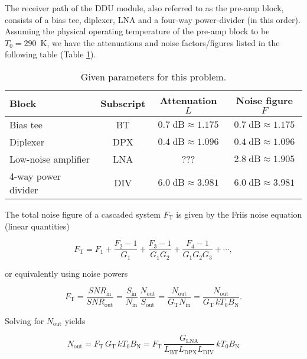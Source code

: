 \documentclass[a4paper, 12pt]{article}
\newlength{\halfLine}
\newcommand{\dB}{\mathrm{\;dB}}
\begin{document}
\vspace*{\halfLine}
\noindent
The receiver path of the DDU module, also referred to as the pre-amp block, 
consists of a bias tee, diplexer, LNA and a four-way power-divider (in this 
order). Assuming the physical operating temperature of the pre-amp block to be 
$T_0 = 290$~K, we have the attenuations and noise factors/figures listed in 
the following table (Table \ref{t:c2}).

\begin{table}[!h]
	\begin{center}
	\caption{Given parameters for this problem.}
	\label{t:c2}
	\renewcommand*{\arraystretch}{1.2}
	\begin{tabular}{lccc}
	\textbf{Block} 			& \textbf{Subscript}	& \textbf{Attenuation} $L$ 	& \textbf{Noise figure} $F$ \\
	\hline
	Bias tee				& BT					& $0.7 \dB \approx 1.175$	& $0.7 \dB \approx 1.175$ \\
	Diplexer				& DPX					& $0.4 \dB \approx 1.096$	& $0.4 \dB \approx 1.096$ \\
	Low-noise amplifier		& LNA					& ???						& $2.8 \dB \approx 1.905$ \\
	4-way power divider		& DIV					& $6.0 \dB \approx 3.981$	& $6.0 \dB \approx 3.981$
	\end{tabular}
	\end{center}
	\vspace*{-12pt}
\end{table}

The total noise figure of a cascaded system $F_\mathrm{T}$ is given by the 
Friis noise equation (linear quantities)

\begin{equation} \label{e:f}
F_\mathrm{T} = F_1 + \frac{F_2 - 1}{G_1} + \frac{F_3 - 1}{G_1 G_2} + \frac{F_4 - 1}{G_1 G_2 G_3} + \cdots,
\end{equation}

\noindent
or equivalently using noise powers

\begin{equation}
F_\mathrm{T} = \frac{\mathit{SNR}_\mathrm{in}}{\mathit{SNR}_\mathrm{out}} 
	= \frac{S_\mathrm{in}}{N_\mathrm{in}} \, \frac{N_\mathrm{out}}{S_\mathrm{out}}
	= \frac{N_\mathrm{out}}{G_\mathrm{T} N_\mathrm{in}}
	= \frac{N_\mathrm{out}}{G_\mathrm{T} \, k T_0 B_\mathrm{N}}.
\end{equation}

\noindent
Solving for $N_\mathrm{out}$ yields

\begin{equation}
N_\mathrm{out} = F_\mathrm{T} \, G_\mathrm{T} \, k T_0 B_\mathrm{N} 
	= F_\mathrm{T} \, \frac{G_\mathrm{LNA}}{L_\mathrm{BT} L_\mathrm{DPX} L_\mathrm{DIV}} \, k T_0 B_\mathrm{N}
\end{equation}
\end{document}
